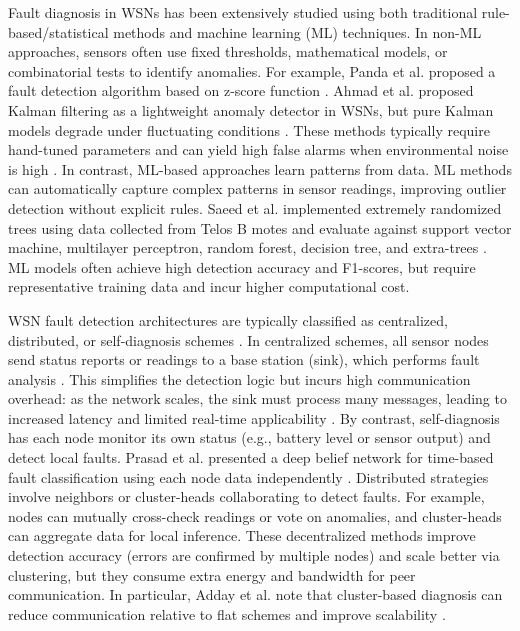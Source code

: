 Fault diagnosis in WSNs has been extensively studied using both traditional rule-based/statistical methods and machine learning (ML) techniques. In non-ML approaches, sensors often use fixed thresholds, mathematical models, or combinatorial tests to identify anomalies. For example, Panda et al. proposed a fault detection algorithm based on z-score function \cite{Panda2014}. Ahmad et al. proposed Kalman filtering as a lightweight anomaly detector in WSNs, but pure Kalman models degrade under fluctuating conditions \cite{Ahmad2024}. These methods typically require hand-tuned parameters and can yield high false alarms when environmental noise is high \cite{Muhammed2017, Zhang2018}. In contrast, ML-based approaches learn patterns from data. ML methods can automatically capture complex patterns in sensor readings, improving outlier detection without explicit rules. Saeed et al. implemented extremely randomized trees using data collected from Telos B motes and evaluate against support vector machine, multilayer perceptron, random forest, decision tree, and extra-trees \cite{Saeed2021}. ML models often achieve high detection accuracy and F1-scores, but require representative training data and incur higher computational cost.

WSN fault detection architectures are typically classified as centralized, distributed, or self-diagnosis schemes \cite{Takele2024, Prasad2023}. In centralized schemes, all sensor nodes send status reports or readings to a base station (sink), which performs fault analysis \cite{Panda2014}. This simplifies the detection logic but incurs high communication overhead: as the network scales, the sink must process many messages, leading to increased latency and limited real-time applicability \cite{Muhammed2017, Zhang2018}. By contrast, self-diagnosis has each node monitor its own status (e.g., battery level or sensor output) and detect local faults. Prasad et al. presented a deep belief network for time-based fault classification using each node data independently \cite{Prasad2023}. Distributed strategies involve neighbors or cluster-heads collaborating to detect faults. For example, nodes can mutually cross-check readings or vote on anomalies, and cluster-heads can aggregate data for local inference. These decentralized methods improve detection accuracy (errors are confirmed by multiple nodes) and scale better via clustering, but they consume extra energy and bandwidth for peer communication. In particular, Adday et al. note that cluster-based diagnosis can reduce communication relative to flat schemes and improve scalability \cite{Adday2022}. 

